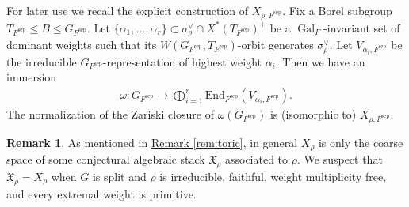 \documentclass[10pt]{amsart}
\newtheorem{lemma}[theorem]{Lemma}
\theoremstyle{definition}
\newtheorem{remark}[theorem]{Remark}
\numberwithin{equation}{section}
\DeclareMathOperator{\Gal}{\mathrm{Gal}}
\numberwithin{equation}{subsection}
\newcommand{\RR}{\mathbb{R}}
\begin{document}
For later use we recall the explicit construction of $X_{\rho,F^{\mathrm{sep}}}$. Fix a Borel subgroup $T_{F^{\mathrm{sep}}}\le B\le G_{F^{\mathrm{sep}}}$. Let $\{\alpha_1,\ldots,\alpha_r\}\subset \sigma_{\rho}^\vee\cap X^*(T_{F^{\mathrm{sep}}})^+$ be a $\Gal_F$-invariant set of dominant weights such that its $W(G_{F^{\mathrm{sep}}},T_{F^{\mathrm{sep}}})$-orbit  generates $\sigma_{\rho}^\vee$. Let $V_{\alpha_i,F^{\mathrm{sep}}}$ be the irreducible $G_{F^{\mathrm{sep}}}$-representation of highest weight $\alpha_i$. Then we have an immersion
\begin{align}\label{eq:immersion}
    \omega:G_{F^{\mathrm{sep}}}\longrightarrow \bigoplus_{i=1}^r\mathrm{End}_{F^{\mathrm{sep}}}(V_{\alpha_i,F^{\mathrm{sep}}}).
\end{align}
The normalization of the Zariski closure of $\omega(G_{F^{\mathrm{sep}}})$ is (isomorphic to) $X_{\rho,F^{\mathrm{sep}}}$.

\begin{remark}
     As mentioned in \hyperref[rem:toric]{Remark \ref{rem:toric}}, in general  $X_\rho$ is only the coarse space of some conjectural algebraic stack $\mathfrak{X}_\rho$ associated to $\rho$.   We suspect that $\mathfrak{X}_\rho=X_\rho$ when $G$ is split and $\rho$ is irreducible, faithful, weight multiplicity free, and every extremal weight is primitive.
\end{remark}

\end{document}
